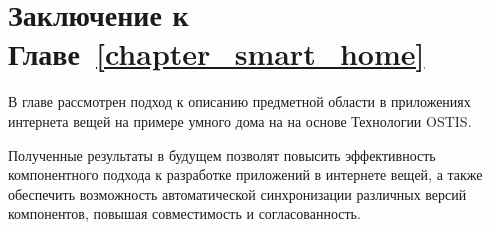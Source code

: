 \section*{Заключение к Главе~\ref{chapter_smart_home}}
\label{sec_SH_plans_and_tasks}

В главе рассмотрен подход к описанию предметной области в приложениях интернета вещей на примере умного дома на на основе Технологии OSTIS.

Полученные результаты в будущем позволят повысить эффективность компонентного подхода к разработке приложений в интернете вещей, а также обеспечить возможность автоматической синхронизации различных версий компонентов, повышая совместимость и согласованность.